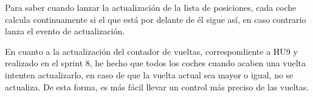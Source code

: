 Para saber cuando lanzar la actualización de la lista de posiciones, cada coche calcula continuamente si el que está por delante de él sigue así, en caso contrario lanza el evento de actualización.

\bigskip

En cuanto a la actualización del contador de vueltas, correspondiente a HU9 y realizado en el sprint 8, he hecho que todos los coches cuando acaben una vuelta intenten actualizarlo, en caso de que la vuelta actual sea mayor o igual, no se actualiza. De esta forma, es más fácil llevar un control más preciso de las vueltas.
